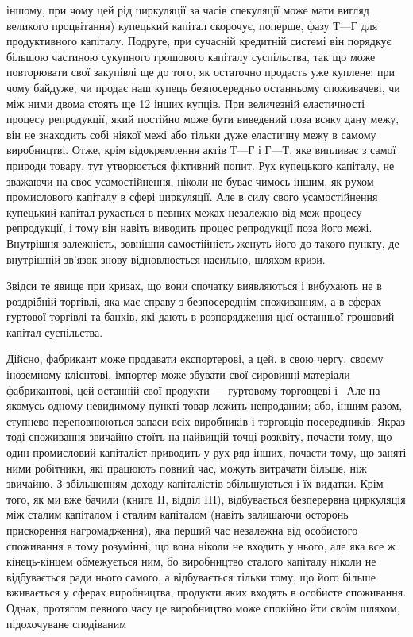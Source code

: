 \parcont{}  %
іншому, при чому цей рід циркуляції за часів спекуляції може
мати вигляд великого процвітання) купецький капітал скорочує,
поперше, фазу $Т — Г$ для продуктивного капіталу. Подруге, при
сучасній кредитній системі він порядкує більшою частиною
сукупного грошового капіталу суспільства, так що може повторювати
свої закупівлі ще до того, як остаточно продасть уже
куплене; при чому байдуже, чи продає наш купець безпосередньо
останньому споживачеві, чи між ними двома стоять ще
12 інших купців. При величезній еластичності процесу репродукції,
який постійно може бути виведений поза всяку дану
межу, він не знаходить собі ніякої межі або тільки дуже еластичну
межу в самому виробництві. Отже, крім відокремлення актів
$Т — Г$ і $Г — Т$, яке випливає з самої природи товару, тут утворюється
фіктивний попит. Рух купецького капіталу, не зважаючи
на своє усамостійнення, ніколи не буває чимось іншим, як рухом
промислового капіталу в сфері циркуляції. Але в силу свого
усамостійнення купецький капітал рухається в певних межах незалежно
від меж процесу репродукції, і тому він навіть виводить
процес репродукції поза його межі. Внутрішня залежність, зовнішня
самостійність женуть його до такого пункту, де внутрішній
зв’язок знову відновлюється насильно, шляхом кризи.

Звідси те явище при кризах, що вони спочатку виявляються
і вибухають не в роздрібній торгівлі, яка має справу з безпосереднім
споживанням, а в сферах гуртової торгівлі та банків,
які дають в розпорядження цієї останньої грошовий капітал
суспільства.

Дійсно, фабрикант може продавати експортерові, а цей, в свою
чергу, своєму іноземному клієнтові, імпортер може збувати
свої сировинні матеріали фабрикантові, цей останній свої продукти
— гуртовому торговцеві і~ Але на якомусь одному
невидимому пункті товар лежить непроданим; або, іншим разом,
ступнево переповнюються запаси всіх виробників і торговців-посередників.
Якраз тоді споживання звичайно стоїть на найвищій
точці розквіту, почасти тому, що один промисловий капіталіст
приводить у рух ряд інших, почасти тому, що заняті
ними робітники, які працюють повний час, можуть витрачати
більше, ніж звичайно. З збільшенням доходу капіталістів збільшуються
і їх видатки. Крім того, як ми вже бачили (книга II,
відділ III), відбувається безперервна циркуляція між сталим капіталом
і сталим капіталом (навіть залишаючи осторонь прискорення
нагромадження), яка перший час незалежна від особистого
споживання в тому розумінні, що вона ніколи не входить
у нього, але яка все ж кінець-кінцем обмежується ним,
бо виробництво сталого капіталу ніколи не відбувається ради
нього самого, а відбувається тільки тому, що його більше
вживається у сферах виробництва, продукти яких входять в особисте
споживання. Однак, протягом певного часу це виробництво
може спокійно йти своїм шляхом, підохочуване сподіваним
\parbreak{}  %
